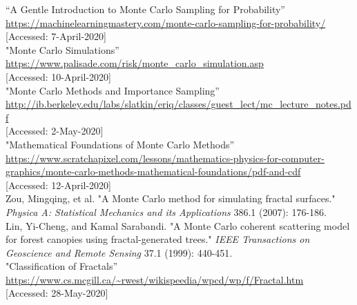 \documentclass{resonance}
\begin{document}
\pagebreak
\setlength{\leftskip}{-4.2cm}
\begin{thebibliography}{99}

\vspace{5pt}
\setlength{\leftskip}{-3.8cm}
“A Gentle Introduction to Monte Carlo Sampling for Probability”\\ \textcolor{blue}{\url{https://machinelearningmastery.com/monte-carlo-sampling-for-probability/}}\\
{[Accessed: 7-April-2020]}\\

"Monte Carlo Simulations”\\ \textcolor{blue}{\url{https://www.palisade.com/risk/monte_carlo_simulation.asp}}\\
{[Accessed: 10-April-2020]}\\

"Monte Carlo Methods and Importance Sampling”\\ \textcolor{blue}{\url{http://ib.berkeley.edu/labs/slatkin/eriq/classes/guest\_lect/mc\_lecture\_notes.pdf }}\\
{[Accessed: 2-May-2020]}\\

"Mathematical Foundations of Monte Carlo Methods”\\ \textcolor{blue}{\url{https://www.scratchapixel.com/lessons/mathematics-physics-for-computer-graphics/monte-carlo-methods-mathematical-foundations/pdf-and-cdf}}\\
{[Accessed: 12-April-2020]}\\

Zou, Mingqing, et al. "A Monte Carlo method for simulating fractal surfaces." \textit{Physica A: Statistical Mechanics and its Applications} 386.1 (2007): 176-186.\\

Lin, Yi-Cheng, and Kamal Sarabandi. "A Monte Carlo coherent scattering model for forest canopies using fractal-generated trees." \textit{IEEE Transactions on Geoscience and Remote Sensing} 37.1 (1999): 440-451.\\

"Classification of Fractals”\\ \textcolor{blue}{\url{https://www.cs.mcgill.ca/~rwest/wikispeedia/wpcd/wp/f/Fractal.htm}}\\
{[Accessed: 28-May-2020]}\\


\end{thebibliography}
\end{document}
